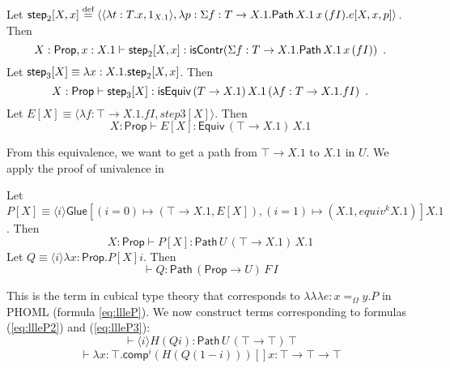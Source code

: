 \documentclass[a4paper,UKenglish]{lipics-v2016}
\newcommand*{\eqdef}{\mathrel{\smash{\stackrel{\text{def}}{=}}}}
\newcommand*{\triplelambda}{\ensuremath{\lambda \!\! \lambda \!\! \lambda}}
\newcommand{\Path}[3]{\ensuremath{\mathsf{Path} \, {#1} \, {#2} \, {#3}}}
\newcommand{\Prop}{\mathsf{Prop}}
\newcommand{\comp}{\mathsf{comp}}
\theoremstyle{plain}
\theoremstyle{definition}
\begin{document}
Let $\steptwo [X,x] \eqdef \langle \langle \lambda t : T.x, 1_{X.1} \rangle,
\lambda p : \Sigma f : T \rightarrow X.1. \Path{X.1}{x}{(fI)}. e[X, x, p] \rangle$.  Then
$$ X : \Prop, x : X.1 \vdash \steptwo [X, x] : \mathsf{isContr}(\Sigma f:T \rightarrow X.1. \Path{X.1}{x}{(fI)}) \enspace . $$
Let $\mathsf{step}_3 [X] \equiv \lambda x : X.1. \mathsf{step}_2 [X, x]$.  Then
$$ X : \Prop \vdash \stepthree [X] : \mathsf{isEquiv} \, (T \rightarrow X.1) \, X.1 \, (\lambda f : T \rightarrow X.1. f I) \enspace . $$
Let $E[X] \equiv \langle \lambda f : \top \rightarrow X.1. f I, step3[X] \rangle$.  Then
$$ X : \Prop \vdash E[X] : \mathsf{Equiv} \, (\top \rightarrow X.1) \, X.1 $$

From this equivalence, we want to get a path from $\top \rightarrow X.1$ to $X.1$ in $U$.  We apply the proof of univalence in \cite{cchm:cubical}

Let $P[X] \equiv \langle i \rangle \mathsf{Glue} [(i = 0) \mapsto (\top \rightarrow X.1, E[X]), (i = 1) \mapsto (X.1, equiv^k X.1)] X.1$.  Then
$$ X : \Prop \vdash P[X] : \Path{U}{(\top \rightarrow X.1)}{X.1} $$
Let $Q \equiv \langle i \rangle \lambda x : \Prop. P[X] i$.  Then
$$ \vdash Q : \Path{(\Prop \rightarrow U)}{F}{I} $$

This is the term in cubical type theory that corresponds to $\triplelambda e : x =_\Omega y.P$ in PHOML (formula \ref{eq:llleP}).  We now construct
terms corresponding to formulas (\ref{eq:llleP2}) and (\ref{eq:llleP3}):
\[ \vdash \langle i \rangle H (Q i) : \Path{U}{(\top \rightarrow \top)}{\top} \]
\[ \vdash \lambda x : \top. \comp^i (H (Q (1 - i))) [] x : \top \rightarrow \top \rightarrow \top \]
\end{document}
